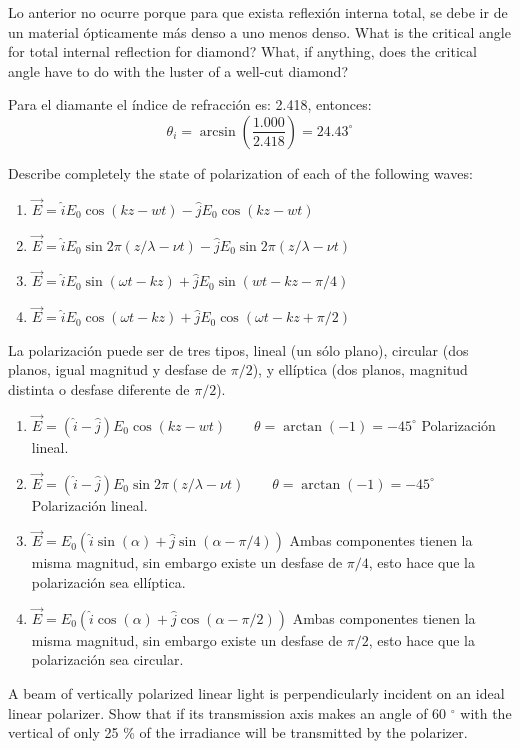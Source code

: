 \documentclass[addpoints,10pt]{exam}
\begin{document}
\begin{questions}
		Lo anterior no ocurre porque para que exista reflexi\'on interna total, se debe ir de un material \'opticamente m\'as denso a uno menos denso.
		{
			\question
			What is the critical angle for total internal reflection for diamond? What, if anything, does the critical angle have to do with the luster of a well-cut diamond?
		}
		
		Para el diamante el \'indice de refracci\'on es: 2.418, entonces:
		\begin{equation}
			\theta_i = \arcsin\left(\dfrac{1.000}{2.418}\right) = 24.43 ^\circ
		\end{equation}

		{
			\question
			Describe completely the state of polarization of each of the following waves:
			\begin{enumerate}
				\item $\vec{E} = \hat{i} E_0\cos(kz-wt) - \hat{j}E_0\cos(kz - wt)$
				\item $\vec{E} = \hat{i}E_0\sin2\pi(z/\lambda - \nu t) - \hat{j}E_0\sin2\pi(z/\lambda - \nu t)$
				\item $\vec{E} = \hat{i}E_0\sin(\omega t -kz) + \hat{j}E_0\sin(wt-kz-\pi/4)$
				\item $\vec{E} = \hat{i}E_0\cos(\omega t - kz) + \hat{j}E_0\cos(\omega t - kz + \pi/2)$
			\end{enumerate}
		}
		
		La polarizaci\'on puede ser de tres tipos, lineal (un s\'olo plano), circular (dos planos, igual magnitud y desfase de $\pi/2$), y ell\'iptica (dos planos, magnitud distinta o desfase diferente de $\pi/2$).
		\begin{enumerate}
			\item $\vec{E} = (\hat{i} - \hat{j})E_0\cos(kz-wt) \qquad \theta = \arctan(-1) = -45^\circ$ Polarizaci\'on lineal.
			\item $\vec{E} = (\hat{i} - \hat{j})E_0\sin2\pi(z/\lambda - \nu t) \qquad \theta = \arctan(-1) = -45^\circ$ Polarizaci\'on lineal.
			
			\item $\vec{E} = E_0\left(\hat{i}\sin(\alpha) + \hat{j}\sin(\alpha - \pi/4)\right)$ Ambas componentes tienen la misma magnitud, sin embargo existe un desfase de $\pi/4$, esto hace que la polarizaci\'on sea ell\'iptica.
			
			\item $\vec{E} =E_0\left(\hat{i}\cos(\alpha) + \hat{j}\cos(\alpha - \pi/2)\right)$ Ambas componentes tienen la misma magnitud, sin embargo existe un desfase de $\pi/2$, esto hace que la polarizaci\'on sea circular.
		\end{enumerate}
		{
			\question
			A beam of vertically polarized linear light is perpendicularly incident on an ideal linear polarizer. Show that if its transmission axis makes an angle of 60 $^\circ$ with the vertical of only 25 \% of the irradiance will be transmitted by the polarizer.
		}
		

\end{questions}
\end{document}
